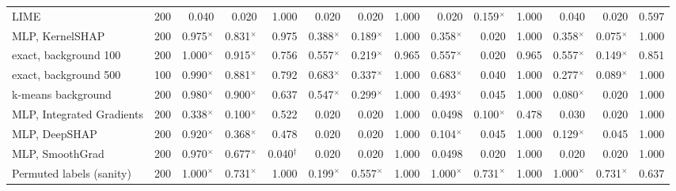 \begin{tabular}{@{}lrrrrrrrrrrrrr@{}}
LIME & 200 & 0.040 & 0.020 & 1.000 & 0.020 & 0.020 & 1.000 & 0.020 & 0.159$^{\times}$ & 1.000 & 0.040 & 0.020 & 0.597 \\
\addlinespace
MLP, KernelSHAP & 200 & 0.975$^{\times}$ & 0.831$^{\times}$ & 0.975 & 0.388$^{\times}$ & 0.189$^{\times}$ & 1.000 & 0.358$^{\times}$ & 0.020 & 1.000 & 0.358$^{\times}$ & 0.075$^{\times}$ & 1.000 \\
\quad exact, background 100 & 200 & 1.000$^{\times}$ & 0.915$^{\times}$ & 0.756 & 0.557$^{\times}$ & 0.219$^{\times}$ & 0.965 & 0.557$^{\times}$ & 0.020 & 0.965 & 0.557$^{\times}$ & 0.149$^{\times}$ & 0.851 \\
\quad exact, background 500 & 100 & 0.990$^{\times}$ & 0.881$^{\times}$ & 0.792 & 0.683$^{\times}$ & 0.337$^{\times}$ & 1.000 & 0.683$^{\times}$ & 0.040 & 1.000 & 0.277$^{\times}$ & 0.089$^{\times}$ & 1.000 \\
\quad k-means background & 200 & 0.980$^{\times}$ & 0.900$^{\times}$ & 0.637 & 0.547$^{\times}$ & 0.299$^{\times}$ & 1.000 & 0.493$^{\times}$ & 0.045 & 1.000 & 0.080$^{\times}$ & 0.020 & 1.000 \\
MLP, Integrated Gradients & 200 & 0.338$^{\times}$ & 0.100$^{\times}$ & 0.522 & 0.020 & 0.020 & 1.000 & 0.0498 & 0.100$^{\times}$ & 0.478 & 0.030 & 0.020 & 1.000 \\
MLP, DeepSHAP & 200 & 0.920$^{\times}$ & 0.368$^{\times}$ & 0.478 & 0.020 & 0.020 & 1.000 & 0.104$^{\times}$ & 0.045 & 1.000 & 0.129$^{\times}$ & 0.045 & 1.000 \\
MLP, SmoothGrad & 200 & 0.970$^{\times}$ & 0.677$^{\times}$ & 0.040$^{\dagger}$ & 0.020 & 0.020 & 1.000 & 0.0498 & 0.020 & 1.000 & 0.020 & 0.020 & 1.000 \\
\addlinespace
Permuted labels (sanity) & 200 & 1.000$^{\times}$ & 0.731$^{\times}$ & 1.000 & 0.199$^{\times}$ & 0.557$^{\times}$ & 1.000 & 1.000$^{\times}$ & 0.731$^{\times}$ & 1.000 & 1.000$^{\times}$ & 0.731$^{\times}$ & 0.637 \\
\bottomrule
\end{tabular}

